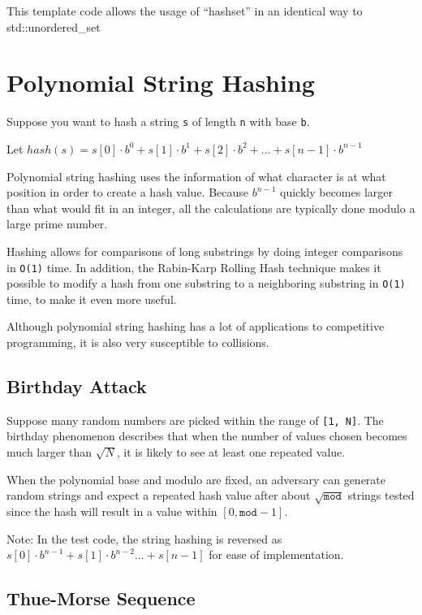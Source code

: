 \documentclass[12pt,a4paper]{article}
\begin{document}
This template code allows the usage of ``hashset'' in an identical
way to std::unordered\_set \cite{Wu_2018}

\section{Polynomial String Hashing}\label{polynomial-string-hashing}

Suppose you want to hash a string \texttt{s} of length \texttt{n} with
base \texttt{b}.

Let \(hash(s) = s[0] \cdot b^0 + s[1] \cdot b^1 + s[2] \cdot b^2 + ... + s[n - 1] \cdot b^{n - 1}\)

Polynomial string hashing uses the information of what character is at
what position in order to create a hash value. Because \(b^{n - 1}\)
quickly becomes larger than what would fit in an integer, all the
calculations are typically done modulo a large prime number.

Hashing allows for comparisons of long substrings by doing integer
comparisons in \texttt{O(1)} time. In addition, the Rabin-Karp Rolling
Hash technique makes it possible to modify a hash from one substring to
a neighboring substring in \texttt{O(1)} time, to make it even more
useful.

Although polynomial string hashing has a lot of applications to
competitive programming, it is also very susceptible to collisions.

\subsection{Birthday Attack}\label{birthday-attack}

Suppose many random numbers are picked within the range of \texttt{[1, N]}.
The birthday phenomenon describes that when the number of values chosen
becomes much larger than \(\sqrt{N}\), it is likely to see at least
one repeated value.

When the polynomial base and modulo are fixed, an adversary can generate
random strings and expect a repeated hash value after about
\(\sqrt{\texttt{mod}}\) strings tested since the hash will result in a value within \([0, \texttt{mod} - 1]\).

Note: In the test code, the string hashing is reversed as\\
\(s[0] \cdot b^{n - 1} + s[1] \cdot b^{n - 2} ... + s[n - 1]\) for ease
of implementation.

\subsection{Thue-Morse Sequence}\label{thue-morse-sequence}
\end{document}
